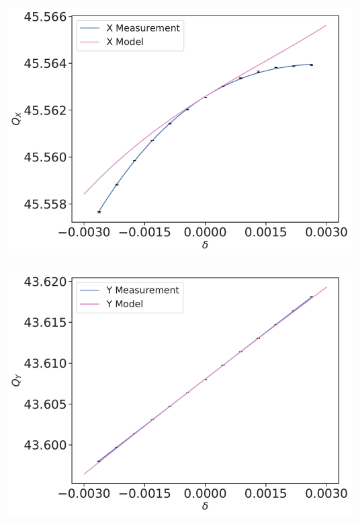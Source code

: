 \begin{figure}[!htb]
    \centering
    \begin{subfigure}[b]{0.49\textwidth}
        \includegraphics[width=\linewidth]{images/kek/chromaticity/HER_09/qx_modelq0q1.pdf}
        \caption{}
    \end{subfigure}
    \begin{subfigure}[b]{0.49\textwidth}
        \includegraphics[width=\linewidth]{images/kek/chromaticity/HER_09/qy_modelq0q1.pdf}
        \caption{}
    \end{subfigure}
    \caption{}
    \label{fig:kek:chroma_HER_detuned}
\end{figure}


